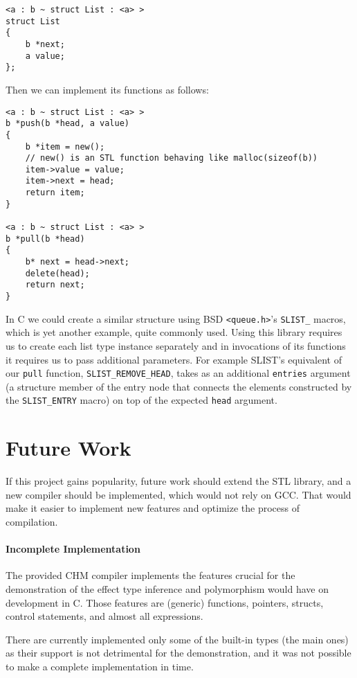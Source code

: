 \begin{lstlisting}
<a : b ~ struct List : <a> >
struct List
{
    b *next;
    a value;
};
\end{lstlisting}

Then we can implement its functions as follows:

\begin{lstlisting}
<a : b ~ struct List : <a> >
b *push(b *head, a value)
{
    b *item = new();
    // new() is an STL function behaving like malloc(sizeof(b))
    item->value = value;
    item->next = head;
    return item;
}

<a : b ~ struct List : <a> >
b *pull(b *head)
{
    b* next = head->next;
    delete(head);
    return next;
}
\end{lstlisting}

In C we could create a similar structure using BSD \lstinline{<queue.h>}'s \cite{pages2007queue} \lstinline{SLIST_} macros, which is yet another example, quite commonly used. Using this library requires us to create each list type instance separately and in invocations of its functions it requires us to pass additional parameters. For example SLIST's equivalent of our \lstinline{pull} function, \lstinline{SLIST_REMOVE_HEAD}, takes as an additional \lstinline{entries} argument (a structure member of the entry node that connects the elements constructed by the \lstinline{SLIST_ENTRY} macro) on top of the expected \lstinline{head} argument.

\section{Future Work}

If this project gains popularity, future work should extend the STL library, and a new compiler should be implemented, which would not rely on GCC. That would make it easier to implement new features and optimize the process of compilation.

\paragraph{Incomplete Implementation}

The provided CHM compiler implements the features crucial for the demonstration of the effect type inference and polymorphism would have on development in C. Those features are (generic) functions, pointers, structs, control statements, and almost all expressions.

There are currently implemented only some of the built-in types (the main ones) as their support is not detrimental for the demonstration, and it was not possible to make a complete implementation in time.


